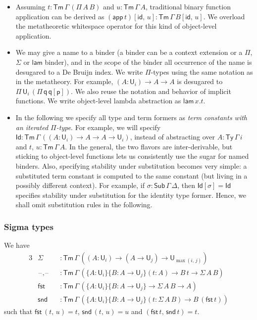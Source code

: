 \documentclass[acmsmall,screen,review,anonymous]{acmart}
\newcommand{\msf}[1]{{\mathsf{#1}}}
\newcommand{\p}{\mathsf{p}}
\newcommand{\q}{\mathsf{q}}
\newcommand{\U}{\msf{U}}
\newcommand{\blank}{{\mathord{\hspace{1pt}\text{--}\hspace{1pt}}}}
\newcommand{\fst}{\msf{fst}}
\newcommand{\snd}{\msf{snd}}
\newcommand{\id}{\msf{id}}
\newcommand{\Sub}{\msf{Sub}}
\newcommand{\Ty}{\msf{Ty}}
\newcommand{\Tm}{\msf{Tm}}
\newcommand{\lam}{\msf{lam}}
\newcommand{\app}{\msf{app}}
\newcommand{\Id}{\msf{Id}}
\begin{document}
\begin{itemize}
\item Assuming $t : \Tm\,\Gamma\,(\Pi\,A\,B)$ and $u : \Tm\,\Gamma\,A$, traditional binary function
  application can be derived as $(\app\,t)[\id,\,u] : \Tm\,\Gamma\,B[\id,\,u]$. We overload the
  metatheoretic whitespace operator for this kind of object-level application.
\item We may give a name to a binder (a binder can be a context extension or a $\Pi$, $\Sigma$ or
  $\lam$ binder), and in the scope of the binder all occurrence of the name is desugared to a De
  Bruijn index.  We write $\Pi$-types using the same notation as in the metatheory. For example, $(A
  : \U_i) \to A \to A$ is desugared to $\Pi\,\U_i\,(\Pi\,\q\,\q[\p])$. We also reuse the notation
  and behavior of implicit functions. We write object-level lambda abstraction as $\lam\,x.t$.
\item
  In the following we specify all type and term formers as \emph{term constants with an iterated
  $\Pi$-type}.  For example, we will specify $\Id : \Tm\,\Gamma\,((A : \U_i) \to A \to A \to \U_i)$,
  instead of abstracting over $A : \Ty\,\Gamma\,i$ and $t,\,u : \Tm\,\Gamma\,A$. In the general, the
  two flavors are inter-derivable, but sticking to object-level functions lets us consistently use
  the sugar for named binders. Also, specifying stability under substitution becomes very simple: a
  substituted term constant is computed to the same constant (but living in a possibly different
  context). For example, if $\sigma : \Sub\,\Gamma\,\Delta$, then $\Id[\sigma] = \Id$ specifies
  stability under substitution for the identity type former. Hence, we shall omit substitution rules
  in the following.
\end{itemize}

\subsubsection{Sigma types} We have
\begin{alignat*}{3}
  &\Sigma        &&: \Tm\,\Gamma\,((A : \U_i) \to (A \to \U_j) \to \U_{\max(i,\,j)}) \\
  &\blank,\blank &&: \Tm\,\Gamma\,(\{A : \U_i\}\{B : A \to \U_j\}(t : A) \to B\,t \to \Sigma\,A\,B)\\
  &\fst          &&: \Tm\,\Gamma\,(\{A : \U_i\}\{B : A \to \U_j\} \to \Sigma\,A\,B \to A)\\
  &\snd          &&: \Tm\,\Gamma\,(\{A : \U_i\}\{B : A \to \U_j\}(t : \Sigma\,A\,B) \to B\,(\fst\,t))
\end{alignat*}
such that $\fst\,(t,\,u) = t$, $\snd\,(t,\,u) = u$ and $(\fst\,t,\,\snd\,t) = t$.
\end{document}
